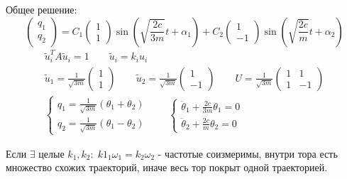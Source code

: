\documentclass{article}
\begin{document}
\begin{eg}
  Общее решение:
  \[
    \begin{pmatrix}
      q_1 \\ q_2
    \end{pmatrix} = C_1 \begin{pmatrix}
      1 \\ 1
    \end{pmatrix} \sin(\sqrt{\frac{2c}{3m}}t+\alpha_1) + C_2 \begin{pmatrix}
      1 \\ -1
    \end{pmatrix} \sin(\sqrt{\frac{2c}{m}}t+\alpha_2)
  \]
  \begin{gather*}
    \tilde{u}_i^{T}A\tilde{u}_i=1 \qquad \tilde{u}_i=k_i u_i \\ 
    \tilde{u}_1=\frac{1}{\sqrt{3m}}\begin{pmatrix}
      1 \\ 1
    \end{pmatrix} \qquad
    \tilde{u}_2=\frac{1}{\sqrt{3m}}\begin{pmatrix}
      1 \\ -1
    \end{pmatrix} \qquad
    U=\frac{1}{\sqrt{3m}}\begin{pmatrix}
      1 & 1 \\ 
      1 & -1
    \end{pmatrix} \\ 
    \left\{\begin{aligned}
      q_1=\frac{1}{\sqrt{3m}}(\theta_1+\theta_2) \\ 
      q_2=\frac{1}{\sqrt{3m}}(\theta_1-\theta_2)
    \end{aligned}\right. \qquad \left\{\begin{aligned}
      \ddot \theta_1 + \frac{2c}{3m}\theta_1 =0 \\ 
      \ddot \theta_2 + \frac{2c}{m}\theta_2 =0
    \end{aligned}\right.
  \end{gather*}


  Если $\exists$ целые $k_1, k_2: \; k1_1\omega_1=k_2\omega_2$ - частотые соизмеримы,
  внутри тора есть множество схожих траекторий, иначе весь тор покрыт одной траекторией.
\end{eg}
\end{document}
